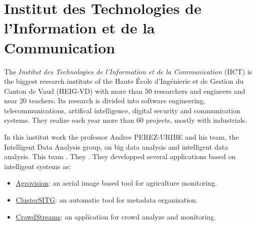 \documentclass[12pt, a4paper]{report}
\begin{document}
		\section{Institut des Technologies de l’Information et de la Communication}
			The {\itshape Institut des Technologies de l’Information et de la Communication} (IICT) is the biggest research institute of the Haute École d'Ingénierie et de Gestion du Canton de Vaud (HEIG-VD) with more than 50 researchers and engineers and near 20 teachers.
			Its research is divided into software engineering, telecommunications, artifical intelligence, digital security and communication systems.
			They realize each year more than 60 projects, mostly with industrials.
			\par
			In this institut work the professor Andres PEREZ-URIBE and his team, the Intelligent Data Analysis group, on big data analysis and intelligent data analysis.
			This team .
			They .
			They developped several applications based on intelligent systems as:
			\begin{itemize}
				\item \href{http://iict.heig-vd.ch/projets#/49/agrovision-developpement-dun-outil-de-suivi-base-sur-limagerie-aerienne-a-haute-resolution-pour-une-meilleure-gestion-agronomique-et-environnementale-de-lagriculture}{Agrovision}: an aerial image based tool for agriculture monitoring.
				\item \href{http://iict.heig-vd.ch/projets#/47/clustersitg-semantic-analysis-and-clustering-of-sitg-catalogue}{ClusterSITG}: an automatic tool for metadata organization.
				\item \href{http://iict.heig-vd.ch/projets#/43/crowdstreams-analyse-et-surveillance-en-temps-r-el-de-mobilit-la-proximit-des-grands-v-nements}{CrowdStreams}: an application for crowd analyze and monitoring.
			\end{itemize}
\end{document}
